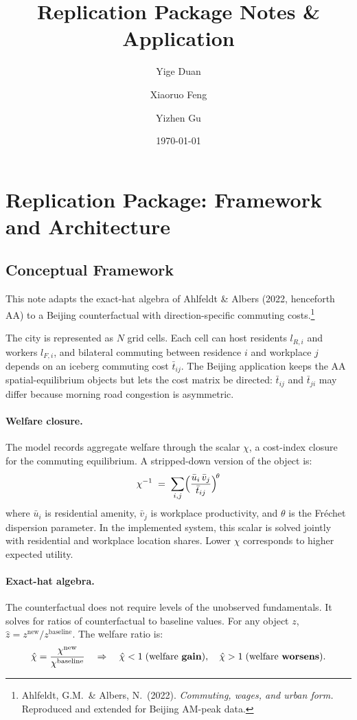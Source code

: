 \documentclass[12pt, a4paper]{article}
\title{\textbf{Replication Package Notes \& Application}}
\author{Yige Duan \and Xiaoruo Feng \and Yizhen Gu}
\date{\today}
\begin{document}
\maketitle
\tableofcontents
\newpage

\section{Replication Package: Framework and Architecture}
\label{sec:replication}

\subsection{Conceptual Framework}

This note adapts the exact-hat algebra of Ahlfeldt \& Albers (2022,
henceforth AA) to a Beijing counterfactual with direction-specific
commuting costs.\footnote{%
  Ahlfeldt, G.M.\ \& Albers, N.\ (2022).
  \emph{Commuting, wages, and urban form.}
  Reproduced and extended for Beijing AM-peak data.}

The city is represented as $N$ grid cells.  Each cell can host residents
$l_{R,i}$ and workers $l_{F,i}$, and bilateral commuting between residence
$i$ and workplace $j$ depends on an iceberg commuting cost
$\bar{t}_{ij}$.  The Beijing application keeps the AA spatial-equilibrium
objects but lets the cost matrix be directed: $\bar{t}_{ij}$ and
$\bar{t}_{ji}$ may differ because morning road congestion is asymmetric.

\paragraph{Welfare closure.}
The model records aggregate welfare through the scalar $\chi$, a
cost-index closure for the commuting equilibrium.  A stripped-down version
of the object is:
\begin{equation}
  \chi^{-1} \;=\; \sum_{i,j}
    \Bigl(\frac{\bar{u}_i\,\bar{v}_j}{\bar{t}_{ij}}\Bigr)^{\!\theta}
  \label{eq:chi}
\end{equation}
where $\bar{u}_i$ is residential amenity, $\bar{v}_j$ is workplace
productivity, and $\theta$ is the Fr\'echet dispersion parameter.  In the
implemented system, this scalar is solved jointly with residential and
workplace location shares.  Lower $\chi$ corresponds to higher expected
utility.

\paragraph{Exact-hat algebra.}
The counterfactual does not require levels of the unobserved fundamentals.
It solves for ratios of counterfactual to baseline values.  For any object
$z$, $\hat{z}=z^{\text{new}}/z^{\text{baseline}}$.  The welfare ratio is:
\begin{equation}
  \hat{\chi} = \frac{\chi^{\text{new}}}{\chi^{\text{baseline}}}
  \quad \Rightarrow \quad
  \hat{\chi} < 1 \;\text{(welfare \textbf{gain})}, \quad
  \hat{\chi} > 1 \;\text{(welfare \textbf{worsens})}.
  \label{eq:chihat}
\end{equation}
\end{document}
